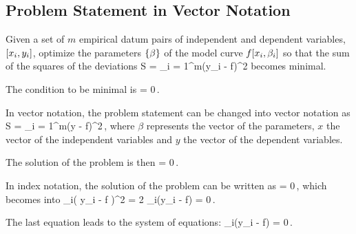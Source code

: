 \subsection{Problem Statement in Vector Notation}
Given a set of $m$ empirical datum pairs of independent and dependent variables, $\left[{x_i, y_i}\right]$, optimize the parameters $\left\lbrace{\beta}\right\rbrace$ of the model curve $f\!\left[{x_i,\beta_i}\right]$ so that the sum of the squares of the deviations
\beq
S = \sum_{i = 1}^{m}\left(y_i - f\right)^2
\eeq
becomes minimal.

The condition to be minimal is
\beq
{} = 0\,.
\eeq

In vector notation, the problem statement can be changed into vector notation as
\beq
S\vat{\beta} = \sum_{i = 1}^{m}\left(y - f\right)^2\,,
\eeq
where $\beta$ represents the vector of the parameters, $x$ the vector of the independent variables and $y$ the vector of the dependent variables.

The solution of the problem is then
\beq
{}\vat{\beta} = 0\,.
\eeq

In index notation, the solution of the problem can be written as
\beq
{} = 0\,,
\eeq
which becomes into
\beq
{}\sum_i\left( y_i - f \right)^2 
    = 2 \sum_i\left(y_i - f\right) = 0\,.
\eeq

The last equation leads to the system of equations:
\beq
\sum_i\left(y_i - f\right) = 0\,.
\eeq
